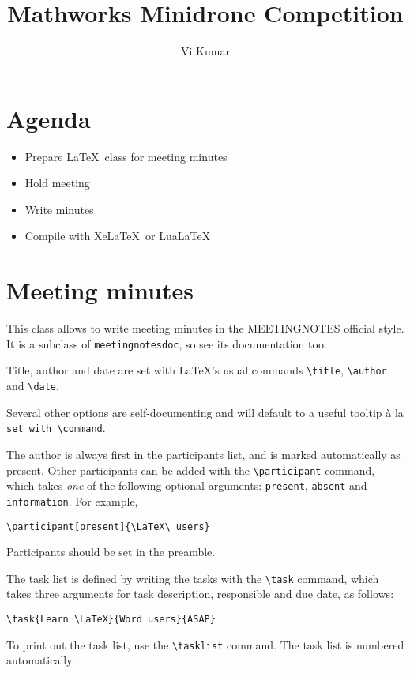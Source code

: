 \documentclass[unrestricted]{meetingnotesminutes}
\title{Mathworks Minidrone Competition}
\author{Vi Kumar}
\begin{document}
\frontmatter

\section*{Agenda}
\begin{itemize}
  \item Prepare \LaTeX\ class for meeting minutes
  \item Hold meeting
  \item Write minutes
  \item Compile with Xe\LaTeX\ or Lua\LaTeX
\end{itemize}

\section*{Meeting minutes}
This class allows to write meeting minutes in the MEETINGNOTES official style.
It is a subclass of \texttt{meetingnotesdoc}, so see its documentation too.

Title, author and date are set with \LaTeX's usual commands
\verb|\title|, \verb|\author| and \verb|\date|.

Several other options are self-documenting and will default to a useful
tooltip à la \texttt{set with \textbackslash command}.

The author is always first in the participants list, and is marked automatically
as present.
Other participants can be added with the \verb|\participant| command, which
takes \emph{one} of the following optional arguments: \verb|present|, \verb|absent|
and \verb|information|.
For example,
\begin{verbatim}
\participant[present]{\LaTeX\ users}
\end{verbatim}
Participants should be set in the preamble.

The task list is defined by writing the tasks with the \verb|\task| command, which
takes three arguments for task description, responsible and due date, as
follows:
\begin{verbatim}
\task{Learn \LaTeX}{Word users}{ASAP}
\end{verbatim}
To print out the task list, use the \verb|\tasklist| command.
The task list is numbered automatically.

\tasklist
\end{document}
